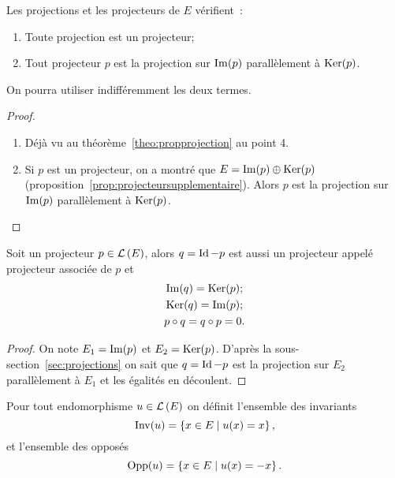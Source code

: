 \begin{prop}
  Les projections et les projecteurs de \(E\) vérifient~:
  \begin{enumerate}
    \item Toute projection est un projecteur;
    \item Tout projecteur \(p\) est la projection sur \(\operatorname{Im}(p)\) 
      parallèlement à \(\operatorname{Ker}(p)\).
  \end{enumerate}
  On pourra utiliser indifféremment les deux termes.
\end{prop}
\begin{proof}
  \begin{enumerate}
    \item Déjà vu au théorème~\ref{theo:propprojection} au point 4.
    \item Si \(p\) est un projecteur, on a montré que \(E = \operatorname{Im}(p) \oplus 
      \operatorname{Ker}(p)\) (proposition~\ref{prop:projecteursupplementaire}). Alors \(p\) est la projection sur 
      \(\operatorname{Im}(p)\) parallèlement à \(\operatorname{Ker}(p)\).
  \end{enumerate}
\end{proof}

\begin{prop}
  Soit un projecteur \(p \in \mathcal{L}\left(E\right)\), alors \(q=\operatorname{Id}-p\) est aussi un 
  projecteur appelé projecteur associée de \(p\) et
  \begin{gather}
    \operatorname{Im}(q) = \operatorname{Ker}(p);\\
    \operatorname{Ker}(q)=\operatorname{Im}(p);\\
    p \circ q = q \circ p =0.
  \end{gather}
\end{prop}
\begin{proof}
  On note \(E_1 = \operatorname{Im}(p)\) et \(E_2 = \operatorname{Ker}(p)\). D'après la sous-section~\ref{sec:projections} on sait que \(q=\operatorname{Id}-p\) est la projection sur \(E_2\) 
  parallèlement à \(E_1\) et les égalités en découlent.
\end{proof}

\begin{defdef}
  Pour tout endomorphisme \(u \in \mathcal{L}\left(E\right)\) on définit l'ensemble des 
  invariants
  \begin{equation}
    \operatorname{Inv}(u)=\left\{x \in E\mathrel{}\middle|\mathrel{}u(x)=x\right\},
  \end{equation}
  et l'ensemble des opposés
  \begin{equation}
    \operatorname{Opp}(u)=\left\{x \in E\mathrel{}\middle|\mathrel{}u(x)=-x\right\}.
  \end{equation}
\end{defdef}

